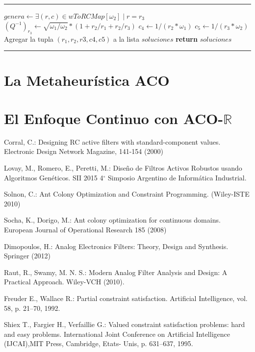 \documentclass{llncs}
\makeatletter
\newenvironment{breakablealgorithm}
{%
	\begin{center}
		\refstepcounter{algorithm}%
		\hrule height.8pt depth0pt \kern2pt%
		\renewcommand{\caption}[2][\relax]{%
			{\raggedright\textbf{\ALG@name~\thealgorithm} ##2\par}%
			\ifx\relax##1\relax %
			\addcontentsline{loa}{algorithm}{\protect\numberline{\thealgorithm}##2}%
			\else %
			\addcontentsline{loa}{algorithm}{\protect\numberline{\thealgorithm}##1}%
			\fi
			\kern2pt\hrule\kern2pt
		}
	}{%
		\kern2pt\hrule\relax%
	\end{center}
}
\makeatother
\begin{document}
\begin{breakablealgorithm}
\begin{algorithmic}[1]
			\State $genera \gets \exists (r,c) \in wToRCMap[\omega_2] \mid r = r_3$ 
			\State $(Q^{-1})_{r_3} \gets \sqrt{\omega_1 / \omega_2} * (1  + r_2/r_1 + r_2/r_3)$
			\State $c_4 \gets 1/(r_2 * \omega_1)$
			\State $c_5 \gets 1/(r_3 * \omega_2)$ 
			\State Agregar la tupla $(r_1, r_2, r3, c4, c5)$ a la lista $soluciones$
			\EndIf
			\EndIf
			\EndFor
			\EndIf
			\EndFor
			\EndFor
			\State \textbf{return} $soluciones$
			\EndProcedure
		\end{algorithmic}
	\end{breakablealgorithm}

  \section{\textbf{La Metaheurística ACO}}
  
  \section{\textbf{El Enfoque Continuo con ACO-$\mathbb{R} $}}

  \begin{thebibliography}{1}
      Corral, C.: 
      Designing RC active filters with standard-component values. Electronic Design
      Network Magazine, 141-154 (2000)
      
      Lovay, M., Romero, E., Peretti, M.:
      Dise\~no de Filtros Activos Robustos usando Algoritmos Gen\'eticos.
      SII 2015 4$^\circ$ Simposio Argentino de Inform\'atica Industrial.
      
      Solnon, C.:
      Ant Colony Optimization and Constraint Programming. (Wiley-ISTE 2010) 
      
      Socha, K., Dorigo, M.:
      Ant colony optimization for continuous domains.
      European Journal of Operational Research 185 (2008)
      
      Dimopoulos, H.: 
      Analog Electronics Filters: Theory, Design and Synthesis. 
      Springer (2012)
      
      Raut, R., Swamy, M. N. S.: 
      Modern Analog Filter Analysis and Design: A Practical Approach. 
      Wiley-VCH (2010).
      
      Freuder E., Wallace R.: 
      Partial constraint satisfaction.
	  Artificial Intelligence, vol. 58, p. 21–70, 1992.
	  
	  Shiex T., Fargier H., Verfaillie G.:
	  Valued constraint satisfaction problems: hard and easy problems. 
	  International Joint Conference on Artificial Intelligence (IJCAI),MIT Press, Cambridge, Etats-
	  Unis, p. 631–637, 1995.
      
      
  \end{thebibliography}
\end{document}
